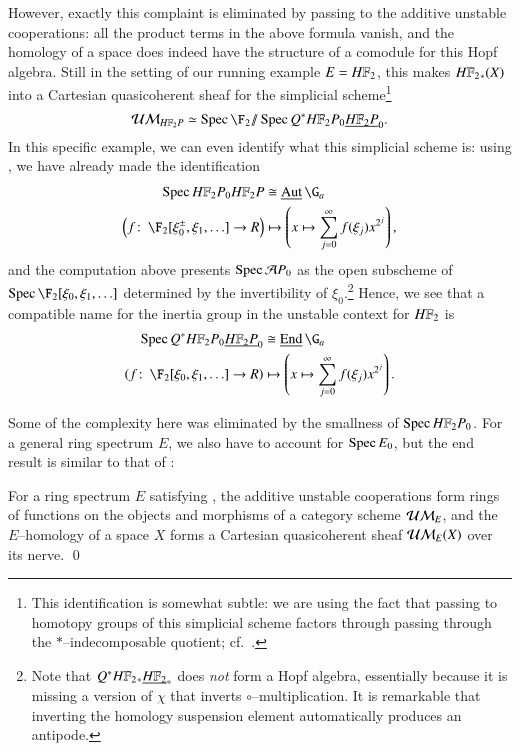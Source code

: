 However, exactly this complaint is eliminated by passing to the additive unstable cooperations: all the product terms in the above formula vanish, and the homology of a space does indeed have the structure of a comodule for this Hopf algebra.  Still in the setting of our running example $E = \HFtwo$, this makes $\HFtwo_*(X)$ into a Cartesian quasicoherent sheaf for the simplicial scheme\footnote{This identification is somewhat subtle: we are using the fact that passing to homotopy groups of this simplicial scheme factors through passing through the $\ast$--indecomposable quotient; cf.\ .} \[\Ucontext{\HFtwo P} \simeq \Spec \F_2 \mmod \Spec Q^* \HFtwo P_0 \OS{\HFtwo P}{0}.\]  In this specific example, we can even identify what this simplicial scheme is: using , we have already made the identification
\begin{align*}
\Spec \HFtwo P_0 \HFtwo P & \cong \InternalAut{\G_a} \\
\left(f\co \F_2[\xi_0^\pm, \xi_1, \ldots] \to R \right) & \mapsto \left(x \mapsto \sum_{j=0}^\infty f(\xi_j) x^{2^j}\right),
\end{align*}
and the computation above presents $\operatorname{Spec} \mathcal A P_0$ as the open subscheme of $\Spec \F_2[\xi_0, \xi_1, \ldots]$ determined by the invertibility of $\xi_0$.\footnote{Note that $Q^* \HFtwo_* \OS{\HFtwo}{*}$ does \emph{not} form a Hopf algebra, essentially because it is missing a version of $\chi$ that inverts $\circ$--multiplication.  It is remarkable that inverting the homology suspension element automatically produces an antipode.}  Hence, we see that a compatible name for the inertia group in the unstable context for $\HFtwo$ is
\begin{align*}
\Spec Q^* \HFtwo P_0 \OS{\HFtwo P}{0} & \cong \InternalEnd{\G_a} \\
\left(f\co \F_2[\xi_0, \xi_1, \ldots] \to R \right) & \mapsto \left(x \mapsto \sum_{j=0}^\infty f(\xi_j) x^{2^j}\right).
\end{align*}

Some of the complexity here was eliminated by the smallness of $\Spec \HFtwo P_0$.  For a general ring spectrum $E$, we also have to account for $\operatorname{Spec} E_0$, but the end result is similar to that of :
\begin{lemma}
For a ring spectrum $E$ satisfying {\UFH}, the additive unstable cooperations form rings of functions on the objects and morphisms of a category scheme $\mathcal{UM}_{E}$, and the $E$--homology of a space $X$ forms a Cartesian quasicoherent sheaf $\mathcal{UM}_{E}(X)$ over its nerve. \qed
\end{lemma}

